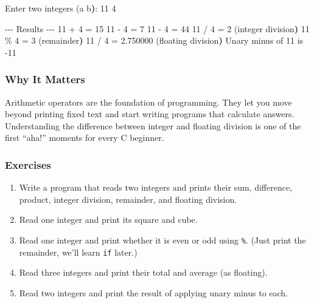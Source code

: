 \documentclass[
  letterpaper,
  DIV=11,
  numbers=noendperiod]{scrreprt}
\newenvironment{Shaded}{\begin{snugshade}}{\end{snugshade}}
\newcommand{\AttributeTok}[1]{\textcolor[rgb]{0.40,0.45,0.13}{#1}}
\newcommand{\BuiltInTok}[1]{\textcolor[rgb]{0.00,0.23,0.31}{#1}}
\newcommand{\ErrorTok}[1]{\textcolor[rgb]{0.68,0.00,0.00}{#1}}
\newcommand{\ExtensionTok}[1]{\textcolor[rgb]{0.00,0.23,0.31}{#1}}
\newcommand{\KeywordTok}[1]{\textcolor[rgb]{0.00,0.23,0.31}{\textbf{#1}}}
\newcommand{\NormalTok}[1]{\textcolor[rgb]{0.00,0.23,0.31}{#1}}
\providecommand{\tightlist}{%
  \setlength{\itemsep}{0pt}\setlength{\parskip}{0pt}}
\begin{document}
\begin{Shaded}
\begin{Highlighting}[]
\ExtensionTok{Enter}\NormalTok{ two integers }\ErrorTok{(}\ExtensionTok{a}\NormalTok{ b}\KeywordTok{)}\BuiltInTok{:}\NormalTok{ 11 4}

\ExtensionTok{{-}{-}{-}}\NormalTok{ Results }\AttributeTok{{-}{-}{-}}
\ExtensionTok{11}\NormalTok{ + 4 = 15}
\ExtensionTok{11} \AttributeTok{{-}}\NormalTok{ 4 = 7}
\ExtensionTok{11} \AttributeTok{{-}}\NormalTok{ 4 = 44}
\ExtensionTok{11}\NormalTok{ / 4 = 2 }\ErrorTok{(}\ExtensionTok{integer}\NormalTok{ division}\KeywordTok{)}
\ExtensionTok{11}\NormalTok{ \% 4 = 3 }\ErrorTok{(}\ExtensionTok{remainder}\KeywordTok{)}
\ExtensionTok{11}\NormalTok{ / 4 = 2.750000 }\ErrorTok{(}\ExtensionTok{floating}\NormalTok{ division}\KeywordTok{)}
\ExtensionTok{Unary}\NormalTok{ minus of 11 is }\AttributeTok{{-}11}
\end{Highlighting}
\end{Shaded}

\subsubsection{Why It Matters}\label{why-it-matters-10}

Arithmetic operators are the foundation of programming. They let you
move beyond printing fixed text and start writing programs that
calculate answers. Understanding the difference between integer and
floating division is one of the first ``aha!'' moments for every C
beginner.

\subsubsection{Exercises}\label{exercises-10}

\begin{enumerate}
\def\labelenumi{\arabic{enumi}.}
\tightlist
\item
  Write a program that reads two integers and prints their sum,
  difference, product, integer division, remainder, and floating
  division.
\item
  Read one integer and print its square and cube.
\item
  Read one integer and print whether it is even or odd using
  \texttt{\%}. (Just print the remainder, we'll learn \texttt{if}
  later.)
\item
  Read three integers and print their total and average (as floating).
\item
  Read two integers and print the result of applying unary minus to
  each.
\end{enumerate}
\end{document}
